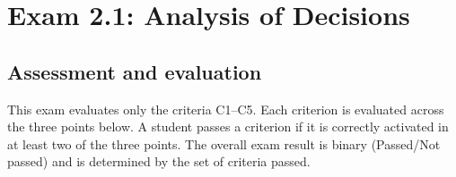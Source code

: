 



\section{Exam 2.1: Analysis of Decisions}\label{sec:grade10-exam2-1}

\ExamNameField

\subsection{Assessment and evaluation}\label{sec:grade10-exam2-1-evaluation}

This exam evaluates only the criteria C1--C5. Each criterion is evaluated across the three points below.
A student passes a criterion if it is correctly activated in at least two of the three points.
The overall exam result is binary (Passed/Not passed) and is determined by the set of criteria passed.

